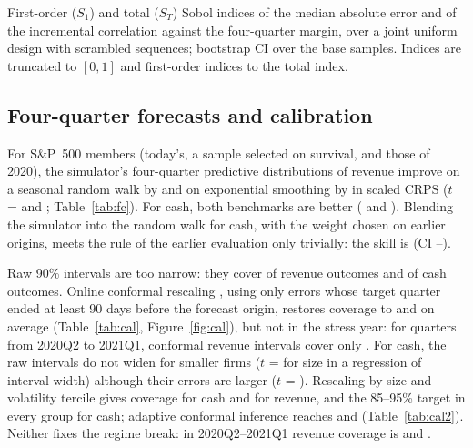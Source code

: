 \begin{table}[!htbp]
\centering\footnotesize
\caption{Sensitivity to assumed parameters}
\label{tab:sens}

\end{table}

\begin{table}[!htbp]
\centering\scriptsize
\caption{Global (Sobol) sensitivity of the transmission result to the assumed parameters}
\label{tab:sobolass}

\par\smallskip
\begin{minipage}{\linewidth}\footnotesize
First-order ($S_1$) and total ($S_T$) Sobol indices of the median absolute error and of the incremental correlation against the four-quarter margin, over a joint uniform design with scrambled sequences; bootstrap CI over the base samples. Indices are truncated to $[0, 1]$ and first-order indices to the total index.
\end{minipage}
\end{table}

\subsection{Four-quarter forecasts and calibration}
For S\&P~500 members (today's, a sample selected on survival, and those of 2020), the simulator's four-quarter predictive distributions of revenue improve on a seasonal random walk by \FcRevRw{} and on exponential smoothing \citep{hyndman2008} by \FcRevEts{} in scaled CRPS ($t$ = \FcRevRwT{} and \FcRevEtsT; Table~\ref{tab:fc}). For cash, both benchmarks are better (\FcCashRw{} and \FcCashEts). Blending the simulator into the random walk for cash, with the weight chosen on earlier origins, meets the rule of the earlier evaluation only trivially: the skill is \CashHybSkill{} (CI \CashHybLo--\CashHybHi).

Raw 90\% intervals are too narrow: they cover \CalRevRaw{} of revenue outcomes and \CalCashRaw{} of cash outcomes. Online conformal rescaling \citep{vovk2005}, using only errors whose target quarter ended at least 90 days before the forecast origin, restores coverage to \CalRevConf{} and \CalCashConf{} on average (Table~\ref{tab:cal}, Figure~\ref{fig:cal}), but not in the stress year: for quarters from 2020Q2 to 2021Q1, conformal revenue intervals cover only \CalRevStress. For cash, the raw intervals do not widen for smaller firms ($t$ = \CalCashWidthSizeT{} for size in a regression of interval width) although their errors are larger ($t$ = \CalCashErrSizeT). Rescaling by size and volatility tercile gives \CalCondCash{} coverage for cash and \CalCondRev{} for revenue, and \CalCondCashOk{} the 85--95\% target in every group for cash; adaptive conformal inference \citep{gibbs2021} reaches \CalAciCash{} and \CalAciRev{} (Table~\ref{tab:cal2}). Neither fixes the regime break: in 2020Q2--2021Q1 revenue coverage is \CalCondRevStress{} and \CalAciRevStress.

